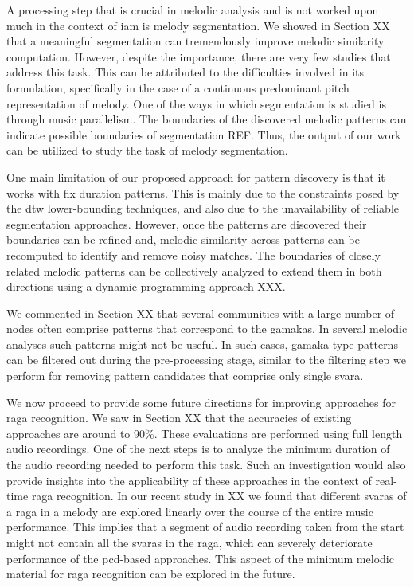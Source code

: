A processing step that is crucial in melodic analysis and is not worked upon much in the context of \gls{iam} is melody segmentation. We showed in Section XX that a meaningful segmentation can tremendously improve melodic similarity computation. However, despite the importance, there are very few studies that address this task. This can be attributed to the difficulties involved in its formulation, specifically in the case of a continuous predominant pitch representation of melody. One of the ways in which segmentation is studied is through music parallelism. The boundaries of the discovered melodic patterns can indicate possible boundaries of segmentation REF. Thus, the output of our work can be utilized to study the task of melody segmentation.  

One main limitation of our proposed approach for pattern discovery is that it works with fix duration patterns. This is mainly due to the constraints posed by the \gls{dtw} lower-bounding techniques, and also due to the unavailability of reliable segmentation approaches. However, once the patterns are discovered their boundaries can be refined and, melodic similarity across patterns can be recomputed to identify and remove noisy matches. The boundaries of closely related melodic patterns can be collectively analyzed to extend them in both directions using a dynamic programming approach XXX.

We commented in Section XX that several communities with a large number of nodes often comprise patterns that correspond to the \glspl{gamaka}. In several melodic analyses such patterns might not be useful. In such cases, \gls{gamaka} type patterns can be filtered out during the pre-processing stage, similar to the filtering step we perform for removing pattern candidates that comprise only single \gls{svara}. 

We now proceed to provide some future directions for improving approaches for \gls{raga} recognition. We saw in Section XX that the accuracies of existing approaches are around to 90\%. These evaluations are performed using full length audio recordings. One of the next steps is to analyze the minimum duration of the audio recording needed to perform this task. Such an investigation would also provide insights into the applicability of these approaches in the context of real-time raga recognition. In our recent study in XX we found that different \glspl{svara} of a \gls{raga} in a melody are explored linearly over the course of the entire music performance. This implies that a segment of audio recording taken from the start might not contain all the \glspl{svara} in the \gls{raga}, which can severely deteriorate performance of the \gls{pcd}-based approaches. This aspect of the minimum melodic material for raga recognition can be explored in the future. 

